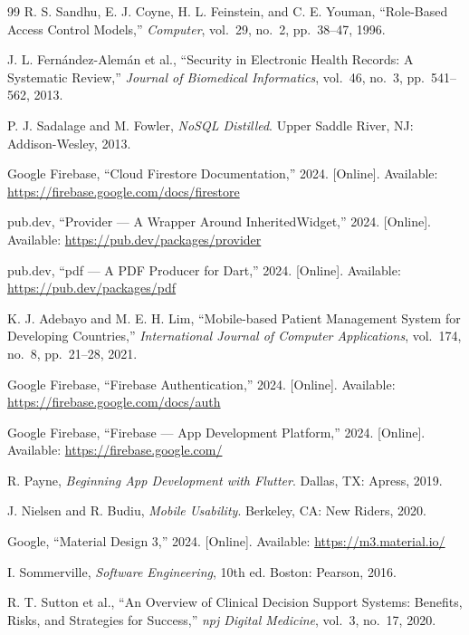 \documentclass[12pt,a4paper,oneside]{report}
\begin{document}
\begin{thebibliography}{99}
 R. S. Sandhu, E. J. Coyne, H. L. Feinstein, and
  C. E. Youman, ``Role-Based Access Control Models,'' \emph{Computer}, vol.~29,
  no.~2, pp.~38--47, 1996.

 J. L. Fern\'andez-Alem\'an et al., ``Security in
  Electronic Health Records: A Systematic Review,'' \emph{Journal of Biomedical
  Informatics}, vol.~46, no.~3, pp.~541--562, 2013.

 P. J. Sadalage and M. Fowler, \emph{NoSQL Distilled}.
  Upper Saddle River, NJ: Addison-Wesley, 2013.

 Google Firebase, ``Cloud Firestore Documentation,''
  2024. [Online]. Available: \url{https://firebase.google.com/docs/firestore}

 pub.dev, ``Provider --- A Wrapper Around
  InheritedWidget,'' 2024. [Online]. Available:
  \url{https://pub.dev/packages/provider}

 pub.dev, ``pdf --- A PDF Producer for Dart,'' 2024.
  [Online]. Available: \url{https://pub.dev/packages/pdf}

 K. J. Adebayo and M. E. H. Lim, ``Mobile-based Patient
  Management System for Developing Countries,'' \emph{International Journal of
  Computer Applications}, vol.~174, no.~8, pp.~21--28, 2021.

 Google Firebase, ``Firebase Authentication,'' 2024.
  [Online]. Available: \url{https://firebase.google.com/docs/auth}

 Google Firebase, ``Firebase --- App Development
  Platform,'' 2024. [Online]. Available: \url{https://firebase.google.com/}

 R. Payne, \emph{Beginning App Development with Flutter}.
  Dallas, TX: Apress, 2019.

 J. Nielsen and R. Budiu, \emph{Mobile Usability}.
  Berkeley, CA: New Riders, 2020.

 Google, ``Material Design 3,'' 2024. [Online]. Available:
  \url{https://m3.material.io/}

 I. Sommerville, \emph{Software Engineering}, 10th ed.
  Boston: Pearson, 2016.

 R. T. Sutton et al., ``An Overview of Clinical Decision
  Support Systems: Benefits, Risks, and Strategies for Success,'' \emph{npj
  Digital Medicine}, vol.~3, no.~17, 2020.

\end{thebibliography}
\end{document}
